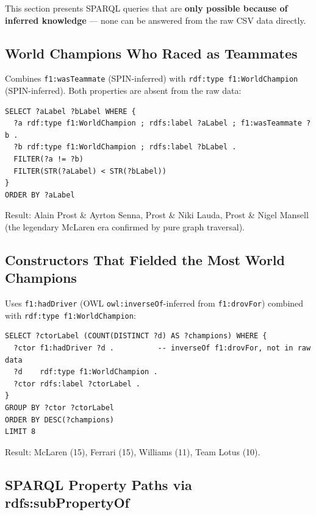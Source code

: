 \documentclass[12pt,a4paper]{article}
\begin{document}
This section presents SPARQL queries that are \textbf{only possible because of
inferred knowledge} --- none can be answered from the raw CSV data directly.

\subsection{World Champions Who Raced as Teammates}

Combines \texttt{f1:wasTeammate} (SPIN-inferred) with \texttt{rdf:type f1:WorldChampion}
(SPIN-inferred). Both properties are absent from the raw data:

\begin{lstlisting}[style=sparql, caption={Champions who shared a constructor in the same race}]
SELECT ?aLabel ?bLabel WHERE {
  ?a rdf:type f1:WorldChampion ; rdfs:label ?aLabel ; f1:wasTeammate ?b .
  ?b rdf:type f1:WorldChampion ; rdfs:label ?bLabel .
  FILTER(?a != ?b)
  FILTER(STR(?aLabel) < STR(?bLabel))
}
ORDER BY ?aLabel
\end{lstlisting}

Result: Alain Prost \& Ayrton Senna, Prost \& Niki Lauda, Prost \& Nigel Mansell
(the legendary McLaren era confirmed by pure graph traversal).

\subsection{Constructors That Fielded the Most World Champions}

Uses \texttt{f1:hadDriver} (OWL \texttt{owl:inverseOf}-inferred from \texttt{f1:drovFor})
combined with \texttt{rdf:type f1:WorldChampion}:

\begin{lstlisting}[style=sparql, caption={Constructor champion headcount via inverseOf-inferred hadDriver}]
SELECT ?ctorLabel (COUNT(DISTINCT ?d) AS ?champions) WHERE {
  ?ctor f1:hadDriver ?d .          -- inverseOf f1:drovFor, not in raw data
  ?d    rdf:type f1:WorldChampion .
  ?ctor rdfs:label ?ctorLabel .
}
GROUP BY ?ctor ?ctorLabel
ORDER BY DESC(?champions)
LIMIT 8
\end{lstlisting}

Result: McLaren (15), Ferrari (15), Williams (11), Team Lotus (10).

\subsection{SPARQL Property Paths via rdfs:subPropertyOf}
\end{document}
